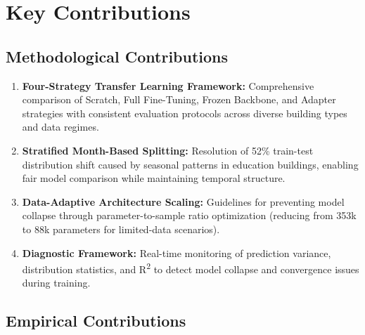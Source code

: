 \documentclass[12pt,a4paper]{report}
\begin{document}
\section{Key Contributions}

\subsection{Methodological Contributions}

\begin{enumerate}
    \item \textbf{Four-Strategy Transfer Learning Framework:} Comprehensive comparison of Scratch, Full Fine-Tuning, Frozen Backbone, and Adapter strategies with consistent evaluation protocols across diverse building types and data regimes.
    
    \item \textbf{Stratified Month-Based Splitting:} Resolution of 52\% train-test distribution shift caused by seasonal patterns in education buildings, enabling fair model comparison while maintaining temporal structure.
    
    \item \textbf{Data-Adaptive Architecture Scaling:} Guidelines for preventing model collapse through parameter-to-sample ratio optimization (reducing from 353k to 88k parameters for limited-data scenarios).
    
    \item \textbf{Diagnostic Framework:} Real-time monitoring of prediction variance, distribution statistics, and R\textsuperscript{2} to detect model collapse and convergence issues during training.
\end{enumerate}

\subsection{Empirical Contributions}
\end{document}
